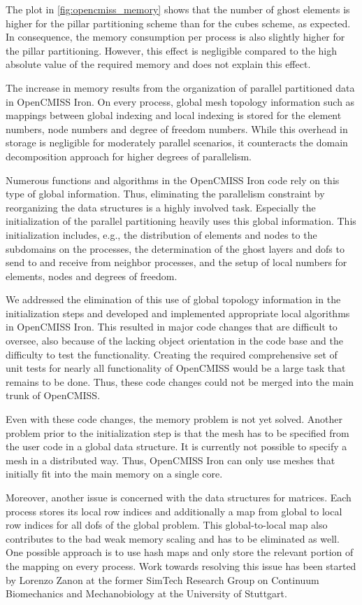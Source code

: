 The plot in \cref{fig:opencmiss_memory} shows that the number of ghost elements is higher for the pillar partitioning scheme than for the cubes scheme, as expected. In consequence, the memory consumption per process is also slightly higher for the pillar partitioning.
However, this effect is negligible compared to the high absolute value of the required memory and does not explain this effect.

The increase in memory results from the organization of parallel partitioned data in OpenCMISS Iron. On every process, global mesh topology information such as mappings between global indexing and local indexing is stored for the element numbers, node numbers and degree of freedom numbers. While this overhead in storage is negligible for moderately parallel scenarios, it counteracts the domain decomposition approach for higher degrees of parallelism. 

Numerous functions and algorithms in the OpenCMISS Iron code rely on this type of global information. Thus, eliminating the parallelism constraint by reorganizing the data structures is a highly involved task. Especially the initialization of the parallel partitioning heavily uses this global information. This initialization includes, e.g., the distribution of elements and nodes to the subdomains on the processes, the determination of the ghost layers and dofs to send to and receive from neighbor processes, and the setup of local numbers for elements, nodes and degrees of freedom.

We addressed the elimination of this use of global topology information in the initialization steps and developed and implemented appropriate local algorithms in OpenCMISS Iron. This resulted in major code changes that are difficult to oversee, also because of the lacking object orientation in the code base and the difficulty to test the functionality. Creating the required comprehensive set of unit tests for nearly all functionality of OpenCMISS would be a large task that remains to be done. Thus, these code changes could not be merged into the main trunk of OpenCMISS.

Even with these code changes, the memory problem is not yet solved. Another problem prior to the initialization step is that the mesh has to be specified from the user code in a global data structure. It is currently not possible to specify a mesh in a distributed way. Thus, OpenCMISS Iron can only use meshes that initially fit into the main memory on a single core.

Moreover, another issue is concerned with the data structures for matrices. Each process stores its local row indices and additionally a map from global to local row indices for all dofs of the global problem. This global-to-local map also contributes to the bad weak memory scaling and has to be eliminated as well. One possible approach is to use hash maps and only store the relevant portion of the mapping on every process. Work towards resolving this issue has been started by Lorenzo Zanon at the former SimTech Research Group on Continuum Biomechanics and Mechanobiology at the University of Stuttgart. 

